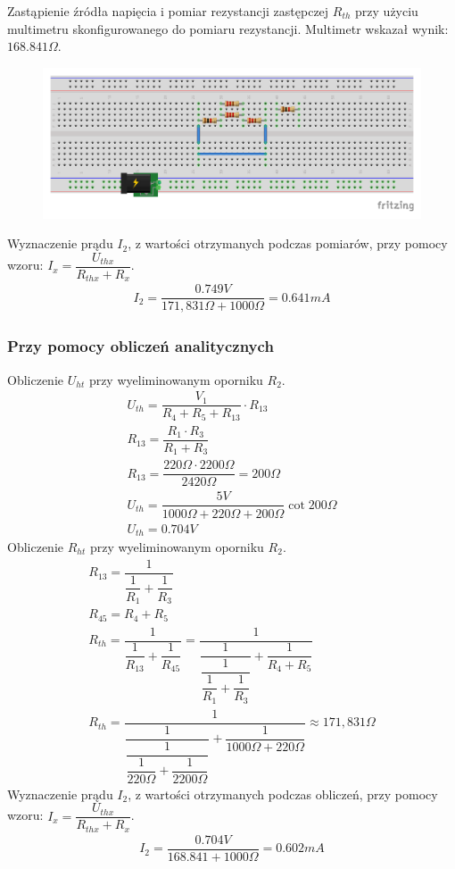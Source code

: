 \documentclass[polish,polish,a4paper]{article}
\begin{document}
\begin{spacing}{2}
		Zastąpienie źródła napięcia i pomiar rezystancji zastępczej $R_{th}$ przy użyciu multimetru skonfigurowanego do pomiaru rezystancji. Multimetr wskazał wynik: $ 168.841\Omega $.
		\begin{figure}[H]
			\centering
			\includegraphics[scale=0.8]{R2_pomiar_oporu_bb.pdf}
		\end{figure}
		Wyznaczenie prądu $I_{2}$, z wartości otrzymanych podczas pomiarów, przy pomocy wzoru: $I_{x}= \dfrac{U_{thx}}{R_{thx} + R_{x}}$.
		\begin{gather*}
		I_{2}=\dfrac{0.749V}{171,831\Omega + 1000\Omega } = 0.641mA
		\end{gather*}
	\subsubsection{Przy pomocy obliczeń analitycznych}
	Obliczenie $U_{ht}$ przy wyeliminowanym oporniku $ R_{2} $.
		\begin{gather*}
	U_{th}= \dfrac{V_{1}}{R_{4}+R_{5}+R_{13}} \cdot R_{13}\\
	R_{13} = \dfrac{R_{1} \cdot R_{3}}{R_{1} + R_{3}}\\
	R_{13} = \dfrac{220\Omega \cdot 2200\Omega}{2420\Omega} = 200\Omega\\
	U_{th} = \dfrac{5V}{1000\Omega + 220\Omega + 200\Omega } \cot 200\Omega\\
	U_{th} = 0.704V
	\end{gather*}
	Obliczenie $R_{ht}$ przy wyeliminowanym oporniku $ R_{2} $.
	\begin{gather*}
	R_{13} = \dfrac{1}{\dfrac{1}{R_{1}} + \dfrac{1}{R_{3}}}\\
	R_{45} = R_{4} + R_{5}\\
	R_{th} = \dfrac{1}{\dfrac{1}{R_{13}} + \dfrac{1}{R_{45}}} = \dfrac{1}{\dfrac{1}{\dfrac{1}{\dfrac{1}{R_{1}} + \dfrac{1}{R_{3}}}} + \dfrac{1}{R_{4} + R_{5}}}\\
	R_{th} = \dfrac{1}{\dfrac{1}{\dfrac{1}{\dfrac{1}{220\Omega} + \dfrac{1}{2200\Omega}}} + \dfrac{1}{1000\Omega + 220\Omega}} \approx 171,831\Omega
	\end{gather*}
		Wyznaczenie prądu $I_{2}$, z wartości otrzymanych podczas obliczeń, przy pomocy wzoru: $I_{x}= \dfrac{U_{thx}}{R_{thx} + R_{x}}$.
	\begin{gather*}
	I_{2}=\dfrac{0.704V}{168.841 + 1000\Omega } = 0.602mA
	\end{gather*}

\end{spacing}
\end{document}

